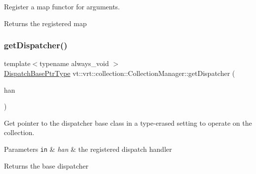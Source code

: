 Register a map functor for arguments. 

\begin{DoxyReturn}{Returns}
the registered map 
\end{DoxyReturn}
\mbox{\label{structvt_1_1vrt_1_1collection_1_1_collection_manager_af183a018e0d2d8b3ed024244d8f83f45}} 
\subsubsection{\texorpdfstring{get\+Dispatcher()}{getDispatcher()}}
{\footnotesize\ttfamily template$<$typename always\+\_\+void $>$ \\
\hyperlink{namespacevt_1_1vrt_1_1collection_aa3b9731ae16d60fac43d68840f3606a5}{Dispatch\+Base\+Ptr\+Type} vt\+::vrt\+::collection\+::\+Collection\+Manager\+::get\+Dispatcher (\begin{DoxyParamCaption}\item[{\hyperlink{structvt_1_1vrt_1_1collection_1_1_collection_manager_a0cfe02a0426e95ec9daa2ef7374e07c7}{Dispatch\+Handler\+Type} const \&}]{han }\end{DoxyParamCaption})}



Get pointer to the dispatcher base class in a type-\/erased setting to operate on the collection. 


\begin{DoxyParams}[1]{Parameters}
\mbox{\tt in}  & {\em han} & the registered dispatch handler\\
\hline
\end{DoxyParams}
\begin{DoxyReturn}{Returns}
the base dispatcher 
\end{DoxyReturn}
\mbox{\label{structvt_1_1vrt_1_1collection_1_1_collection_manager_ab672ad6c3bc9fdc5a9577a9ae0677d1f}} 
